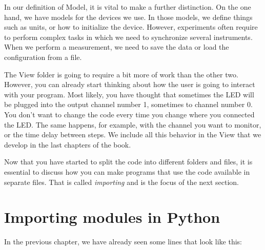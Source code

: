 
In our definition of Model, it is vital to make a further distinction. On the one hand, we have models for the devices we use. In those models, we define things such as units, or how to initialize the device. However, experiments often require to perform complex tasks in which we need to synchronize several instruments. When we perform a measurement, we need to save the data or load the configuration from a file.


The View folder is going to require a bit more of work than the other two. However, you can already start thinking about how the user is going to interact with your program. Most likely, you have thought that sometimes the {LED} will be plugged into the output channel number 1, sometimes to channel number 0. You don't want to change the code every time you change where you connected the LED. The same happens, for example, with the channel you want to monitor, or the time delay between steps. We include all this behavior in the View that we develop in the last chapters of the book.

Now that you have started to split the code into different folders and files, it is essential to discuss how you can make programs that use the code available in separate files. That is called \emph{importing} and is the focus of the next section.

\section{Importing modules in Python}\label{sec:importing-python}
In the previous chapter, we have already seen some lines that look like this:


